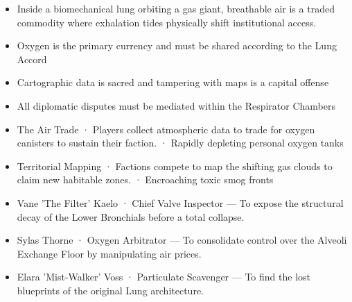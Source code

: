 \documentclass[10pt,a4paper]{article}
\newcommand{\heading}[1]{\par\vspace{5pt}{\color{teal}\bfseries #1}\par}
\begin{document}
\begin{minipage}[t]{0.48\linewidth}\fontsize{9}{12}\selectfont\raggedright\setlength{\parskip}{0pt}
\heading{世界概述}\begin{itemize}
\item Inside a biomechanical lung orbiting a gas giant, breathable air is a traded commodity where exhalation tides physically shift institutional access.
\end{itemize}
\heading{规则与制度}\begin{itemize}
\item Oxygen is the primary currency and must be shared according to the Lung Accord
\item Cartographic data is sacred and tampering with maps is a capital offense
\item All diplomatic disputes must be mediated within the Respirator Chambers
\end{itemize}
\heading{活动与压力}\begin{itemize}
\item The Air Trade · Players collect atmospheric data to trade for oxygen canisters to sustain their faction. · Rapidly depleting personal oxygen tanks
\item Territorial Mapping · Factions compete to map the shifting gas clouds to claim new habitable zones. · Encroaching toxic smog fronts
\end{itemize}
\heading{人物与目标}\begin{itemize}
\item Vane 'The Filter' Kaelo · Chief Valve Inspector — To expose the structural decay of the Lower Bronchials before a total collapse.
\item Sylas Thorne · Oxygen Arbitrator — To consolidate control over the Alveoli Exchange Floor by manipulating air prices.
\item Elara 'Mist-Walker' Voss · Particulate Scavenger — To find the lost blueprints of the original Lung architecture.
\end{itemize}
\end{minipage}\hfill
\end{document}
